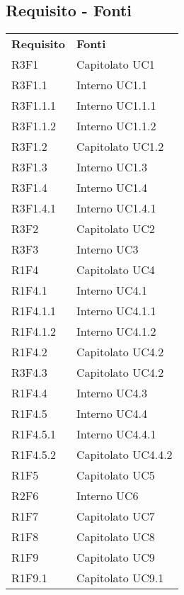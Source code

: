 	\subsection{Requisito - Fonti}
	\begin{longtable} {
			>{\centering}p{28mm}  
			>{}p{20mm}
		}
		\rowcolor{gray!50}
		\textbf{Requisito} & \textbf{Fonti}	\TBstrut \\
		R3F1 & Capitolato UC1 \TBstrut \\ [2mm]	
		R3F1.1 & Interno UC1.1 \TBstrut \\ [2mm]
		R3F1.1.1 & Interno UC1.1.1 \TBstrut \\ [2mm]
		R3F1.1.2 & Interno UC1.1.2 \TBstrut \\ [2mm]				
		R3F1.2 & Capitolato UC1.2 \TBstrut \\ [2mm]		
		R3F1.3 & Interno UC1.3 \TBstrut \\ [2mm]				
		R3F1.4 & Interno UC1.4 \TBstrut \\ [2mm]
		R3F1.4.1 & Interno UC1.4.1 \TBstrut \\ [2mm]		
		R3F2 & Capitolato UC2 \TBstrut \\ [2mm]		
		R3F3 & Interno UC3 \TBstrut \\ [2mm]		
		R1F4 & Capitolato UC4 \TBstrut \\ [2mm]	
		R1F4.1 & Interno UC4.1 \TBstrut \\ [2mm]		
		R1F4.1.1 & Interno UC4.1.1 \TBstrut \\ [2mm]
		R1F4.1.2 & Interno UC4.1.2 \TBstrut \\ [2mm]		
		R1F4.2 & Capitolato UC4.2 \TBstrut \\ [2mm]				
		R3F4.3 & Capitolato UC4.2 \TBstrut \\ [2mm]		
		R1F4.4 & Interno UC4.3 \TBstrut \\ [2mm]
		R1F4.5 & Interno UC4.4 \TBstrut \\ [2mm]
		R1F4.5.1 & Interno UC4.4.1 \TBstrut \\ [2mm]
		R1F4.5.2 & Capitolato UC4.4.2 \TBstrut \\ [2mm]		
		R1F5 & Capitolato UC5 \TBstrut \\ [2mm]
		R2F6 & Interno UC6 \TBstrut \\ [2mm]		
		R1F7 & Capitolato UC7 \TBstrut \\ [2mm]
		R1F8 & Capitolato UC8 \TBstrut \\ [2mm]
		R1F9 & Capitolato UC9 \TBstrut \\ [2mm]
		R1F9.1 & Capitolato UC9.1 \TBstrut \\ [2mm]

\end{longtable}
